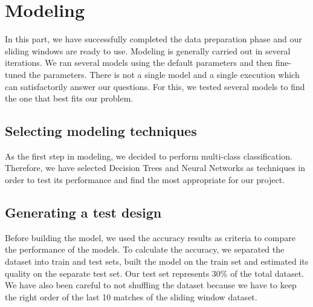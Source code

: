 \chapter{Modeling}
\label{cha:Modeling}

In this part, we have successfully completed the data preparation phase and our sliding windows are ready to use. \newline \newline
Modeling is generally carried out in several iterations. We ran several models using the default parameters and then fine-tuned the parameters. There is not a single model and a single execution which can satisfactorily answer our questions. For this, we tested several models to find the one that best fits our problem.


\section{Selecting modeling techniques}

As the first step in modeling, we decided to perform multi-class classification.\newline
Therefore, we have selected Decision Trees and Neural Networks as techniques in order to test its performance and find the most appropriate for our project.

\section{Generating a test design}

Before building the model, we used the accuracy results as criteria to compare the performance of the models.\newline \newline
To calculate the accuracy, we separated the dataset into train and test sets, built the model on the train set and estimated its quality on the separate test set. Our test set represents 30\% of the total dataset.\newline \newline
We have also been careful to not shuffling the dataset because we have to keep the right order of the last 10 matches of the sliding window dataset.

